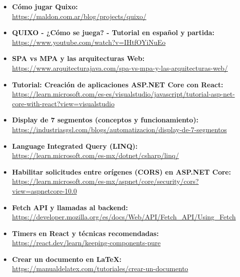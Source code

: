 \documentclass[11pt,a4paper]{article}
\begin{document}
\begin{itemize}
    \item \textbf{Cómo jugar Quixo:}\\
    \url{https://maldon.com.ar/blog/projects/quixo/}

    \item \textbf{QUIXO - ¿Cómo se juega? - Tutorial en español y partida:}\\
    \url{https://www.youtube.com/watch?v=IHtfOYiNuEo}
    
    \item \textbf{SPA vs MPA y las arquitecturas Web:}\\
    \url{https://www.arquitecturajava.com/spa-vs-mpa-y-las-arquitecturas-web/}
    
    \item \textbf{Tutorial: Creación de aplicaciones ASP.NET Core con React:}\\
    \url{https://learn.microsoft.com/es-es/visualstudio/javascript/tutorial-asp-net-core-with-react?view=visualstudio}
    
    \item \textbf{Display de 7 segmentos (conceptos y funcionamiento):}\\
    \url{https://industriasgsl.com/blogs/automatizacion/display-de-7-segmentos}

    \item \textbf{Language Integrated Query (LINQ):}\\
    \url{https://learn.microsoft.com/es-mx/dotnet/csharp/linq/}

    \item \textbf{Habilitar solicitudes entre orígenes (CORS) en ASP.NET Core:}\\
    \url{https://learn.microsoft.com/es-mx/aspnet/core/security/cors?view=aspnetcore-10.0}

    \item \textbf{Fetch API y llamadas al backend:}\\
    \url{https://developer.mozilla.org/es/docs/Web/API/Fetch_API/Using_Fetch}

    \item \textbf{Timers en React y técnicas recomendadas:}\\
    \url{https://react.dev/learn/keeping-components-pure}

    \item \textbf{Crear un documento en LaTeX:}\\
    \url{https://manualdelatex.com/tutoriales/crear-un-documento}
\end{itemize}
\end{document}
